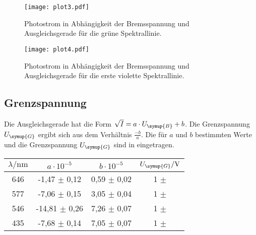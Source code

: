 \begin{figure}[!hbt]
    \centering
    \label{fig:gruen}
    \caption{Photostrom in Abhängigkeit der Bremsspannung und Ausgleichsgerade für die grüne Spektrallinie.}
    \texttt{[image: plot3.pdf]}
\end{figure}

\begin{figure}[!hbt]
    \centering
    \label{fig:violett1}
    \caption{Photostrom in Abhängigkeit der Bremsspannung und Ausgleichsgerade für die erste violette Spektrallinie.}
    \texttt{[image: plot4.pdf]}
\end{figure}

\subsection{Grenzspannung}
\label{sec:Grenzspannung}
Die Ausgleichsgerade hat die Form $\sqrt{I} = a \cdot U_{\symup{B}} + b$. Die Grenzspannung $U_{\symup{G}}$
ergibt sich aus dem Verhältnis $\frac{-b}{a}$. Die für $a$ und $b$ bestimmten Werte und die Grenzspannung
$U_{\symup{G}}$ sind in eingetragen.
\begin{table}[!hbt]
    \centering
    \label{tab:UG}
    \begin{tabular}{c c c c}
        \toprule
        $\lambda/\unit{\nano\meter}$ & $a\cdot 10^{-5}$ & $b\cdot 10^{-5}$ & $U_{\symup{G}}/\unit{\volt}$\\
        \midrule
        646 &  -1,47 $\pm$ 0,12 & 0,59 $\pm$ 0,02 & 1 $\pm$ \\
        577 &  -7,06 $\pm$ 0,15 & 3,05 $\pm$ 0,04 & 1 $\pm$ \\
        546 & -14,81 $\pm$ 0,26 & 7,26 $\pm$ 0,07 & 1 $\pm$ \\
        435 &  -7,68 $\pm$ 0,14 & 7,05 $\pm$ 0,07 & 1 $\pm$ \\
        \bottomrule
    \end{tabular}
\end{table}